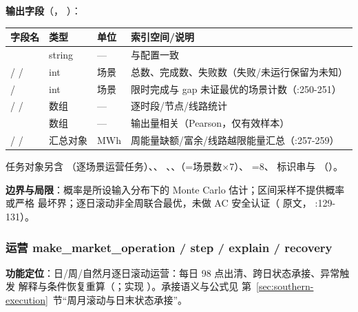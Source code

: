 \textbf{输出字段}（，
）：
\begin{center}\footnotesize
\begin{longtable}{@{}L{4.6cm}L{3.4cm}L{1.7cm}L{5.6cm}@{}}
\toprule 字段名 & 类型 & 单位 & 索引空间/说明\\\midrule
\endhead
{} & string & — & 与配置一致\\
 /  /  & int & 场景 & 总数、完成数、失败数（失败/未运行保留为未知）\\
 /  & int & 场景 & 限时完成与 gap 未证最优的场景计数（:250-251）\\
 /  /  & 数组 & — & 逐时段/节点/线路统计\\
 & 数组 & — & 输出量相关（Pearson，仅有效样本）\\
 /  /  & 汇总对象 & MWh & 周能量缺额/富余/线路越限能量汇总（:257-259）\\
\bottomrule
\end{longtable}
\end{center}
任务对象另含 （逐场景运营任务）、、
、、（=场景数$\times7$）、
=8、 标识串与 
（）。

\textbf{边界与局限}：概率是所设输入分布下的 Monte Carlo 估计；区间采样不提供概率或严格
最坏界；逐日滚动非全周联合最优，未做 AC 安全认证（ 原文，
:129-131）。

\subsubsection{运营 make\_market\_operation / step / explain / recovery}
\textbf{功能定位}：日/周/自然月逐日滚动运营：每日 98 点出清、跨日状态承接、异常触发
解释与条件恢复重算（；实现
）。承接语义与公式见
第~\ref{sec:southern-execution}~节“周月滚动与日末状态承接”。

